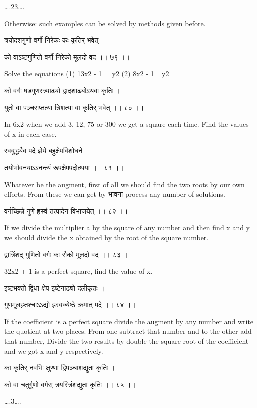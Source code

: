 \documentclass[]{article}
\date{}
\begin{document}
{\ldots{}.23\ldots{}. }

{Otherwise: such examples can be solved by methods given before.}

{त्रयोदशगुणो वर्गो निरेकः कः कृतिर् भवेत् ।}

{को वाऽष्टगुणितो वर्गो निरेको मूलदो वद ।। ७९ ।। }

{Solve the equations (1) 13x}{2}{ - 1 = y}{2}{ (2) 8x}{2}{ - 1 =y}{2}

{को वर्गः षडगुणस्त्र्याढ्यो द्वादशाढ्योऽथवा कृतिः । }

{युतो वा पञ्चसप्तत्या त्रिशत्या वा कृतिर् भवेत् ।। ८० ।। }

{In 6x}{2}{ when we add 3, 12, 75 or 300 we get a square each time. Find
the values of x in each case.}

{स्वबुद्ध्यैव पदे ज्ञेये बहुक्षेपविशोधने । }

{तयोर्भावनयाऽऽनन्त्यं रूपक्षेपपदोत्थया ।। ८१ ।। }

{Whatever be the augment, first of all we should find the two roots by
our own efforts. From these we can get by भावना process any number of
solutions.}

{वर्गच्छिन्ने गुणे ह्रस्वं तत्पादेन विभाजयेत् ।। ८२ ।। }

{If we divide the multiplier a by the square of any number and then find
x and y we should divide the x obtained by the root of the square
number. }

{द्वात्रिंशद् गुणितो वर्गः कः सैको मूलदो वद ।। ८३ ।। }

{32x}{2 }{+ 1 is a perfect square, find the value of x. }

{इष्टभक्तो द्विधा क्षेप इष्टेनाढ्यो दलीकृतः । }

{गुणमूलहृतश्चाऽऽद्यो ह्रस्वज्येष्ठे क्रमात् पदे ।। ८४ ।। }

{If the coefficient is a perfect square divide the augment by any number
and write the quotient at two places. From one subtract that number and
to the other add that number, Divide the two results by double the
square root of the coefficient and we got x and y respectively.}

{का कृतिर् नवभिः क्षुण्णा द्विपञ्चाशद्युता कृतिः । }

{को वा चतुर्गुणो वर्गस् त्रयस्त्रिंशद्युता कृतिः ।। ८५ ।। }

{\ldots{}.3\ldots{}.}
\end{document}

